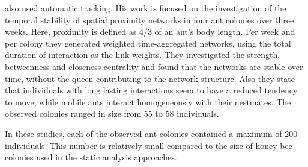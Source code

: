 \textcite{jeanson2012long} also used automatic tracking.
His work is focused on the investigation of the temporal stability of spatial proximity networks in four ant colonies over three weeks.
Here, proximity is defined as 4/3 of an ant’s body length.
Per week and per colony they generated weighted time-aggregated networks, using the total duration of interaction as the link weights.
They investigated the strength, betweenness and closeness centrality and found that the networks are stable over time, without the queen contributing to the network structure.
Also they state that individuals with long lasting interactions seem to have a reduced tendency to move, while mobile ants interact homogeneously with their nestmates.
The observed colonies ranged in size from 55 to 58 individuals.


In these studies, each of the observed ant colonies contained a maximum of 200 individuals. This number is relatively small compared to the size of honey bee colonies used in the static analysis approaches.